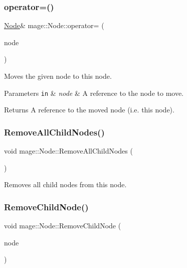 \subsubsection{\texorpdfstring{operator=()}{operator=()}\hspace{0.1cm}{\footnotesize\ttfamily [2/2]}}
{\footnotesize\ttfamily \hyperlink{classmage_1_1_node}{Node}\& mage\+::\+Node\+::operator= (\begin{DoxyParamCaption}\item[{\hyperlink{classmage_1_1_node}{Node} \&\&}]{node }\end{DoxyParamCaption})\hspace{0.3cm}{\ttfamily [delete]}}

Moves the given node to this node.


\begin{DoxyParams}[1]{Parameters}
\mbox{\tt in}  & {\em node} & A reference to the node to move. \\
\hline
\end{DoxyParams}
\begin{DoxyReturn}{Returns}
A reference to the moved node (i.\+e. this node). 
\end{DoxyReturn}
\hypertarget{classmage_1_1_node_a7627e4e280fc9dd13d255c0f64eba79e}{}\label{classmage_1_1_node_a7627e4e280fc9dd13d255c0f64eba79e} 
\subsubsection{\texorpdfstring{Remove\+All\+Child\+Nodes()}{RemoveAllChildNodes()}}
{\footnotesize\ttfamily void mage\+::\+Node\+::\+Remove\+All\+Child\+Nodes (\begin{DoxyParamCaption}{ }\end{DoxyParamCaption})\hspace{0.3cm}{\ttfamily [noexcept]}}

Removes all child nodes from this node. \hypertarget{classmage_1_1_node_a0da235c6459c315ad1c4be5c7aa7c7f0}{}\label{classmage_1_1_node_a0da235c6459c315ad1c4be5c7aa7c7f0} 
\subsubsection{\texorpdfstring{Remove\+Child\+Node()}{RemoveChildNode()}}
{\footnotesize\ttfamily void mage\+::\+Node\+::\+Remove\+Child\+Node (\begin{DoxyParamCaption}\item[{\hyperlink{namespacemage_a1e01ae66713838a7a67d30e44c67703e}{Shared\+Ptr}$<$ \hyperlink{classmage_1_1_node}{Node} $>$}]{node }\end{DoxyParamCaption})}

